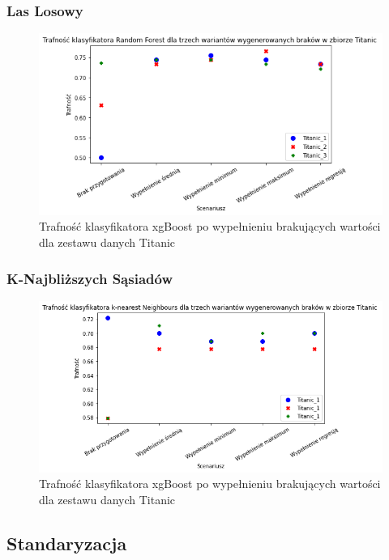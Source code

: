 \documentclass{book}
\begin{document}
\subsubsection{Las Losowy}

\begin{figure}[H]
    \centerline{\includegraphics[scale=0.5]{Titanic_rfc_Wypełnienie_brakujących}}
    \centering
    \caption{Trafność klasyfikatora xgBoost po wypełnieniu brakujących wartości dla zestawu danych Titanic}
    \end{figure}
    
\subsubsection{K-Najbliższych Sąsiadów}
\begin{figure}[H]
    \centerline{\includegraphics[scale=0.5]{Titanic_knn_Wypełnienie_brakujących}}
    \centering
    \caption{Trafność klasyfikatora xgBoost po wypełnieniu brakujących wartości dla zestawu danych Titanic}
    \end{figure}
\subsection{Standaryzacja}
\end{document}
